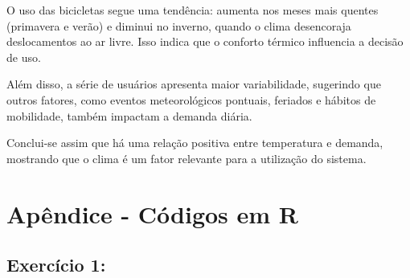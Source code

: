 \documentclass[a4paper,11pt]{article}
\begin{document}
O uso das bicicletas segue uma tendência: aumenta nos meses mais quentes (primavera e verão) e diminui no inverno, quando o clima desencoraja deslocamentos ao ar livre. Isso indica que o conforto térmico influencia a decisão de uso.

Além disso, a série de usuários apresenta maior variabilidade, sugerindo que outros fatores, como eventos meteorológicos pontuais, feriados e hábitos de mobilidade, também impactam a demanda diária.

Conclui-se assim que há uma relação positiva entre temperatura e demanda, mostrando que o clima é um fator relevante para a utilização do sistema.


\newpage
\section{\textbf{Apêndice - Códigos em R}}

\subsection{Exercício 1:}
\end{document}
